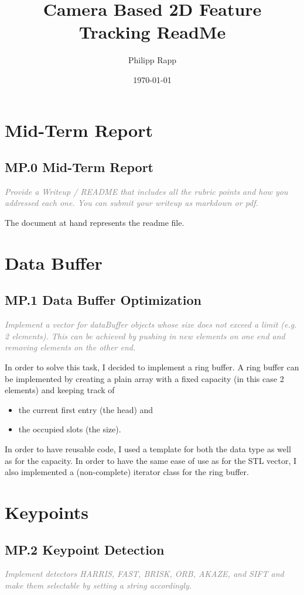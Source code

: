 \documentclass[a4paper]{scrartcl}
\title{Camera Based 2D Feature Tracking ReadMe}
\author{Philipp Rapp}
\date{\today}
\begin{document}
\maketitle

\section*{Mid-Term Report}
\subsection*{MP.0 Mid-Term Report}
\textcolor{gray}{\textit{Provide a Writeup / README that includes all the rubric points and how you addressed each one. You can submit your writeup as markdown or pdf.}}

The document at hand represents the readme file.

\section*{Data Buffer}
\subsection*{MP.1 Data Buffer Optimization}
\textcolor{gray}{\textit{Implement a vector for dataBuffer objects whose size does not exceed a limit (e.g. 2 elements). This can be achieved by pushing in new elements on one end and removing elements on the other end.}}

In order to solve this task, I decided to implement a ring buffer.
A ring buffer can be implemented by creating a plain array with a fixed capacity (in this case 2 elements)
and keeping track of
\begin{itemize}
	\item the current first entry (the head) and
	\item the occupied slots (the size).
\end{itemize}
In order to have reusable code, I used a template for both the data type as well as
for the capacity.
In order to have the same ease of use as for the STL vector, I also implemented a (non-complete)
iterator class for the ring buffer.

\section*{Keypoints}
\subsection*{MP.2 Keypoint Detection}
\textcolor{gray}{\textit{Implement detectors HARRIS, FAST, BRISK, ORB, AKAZE, and SIFT and make them selectable by setting a string accordingly.}}
\end{document}

